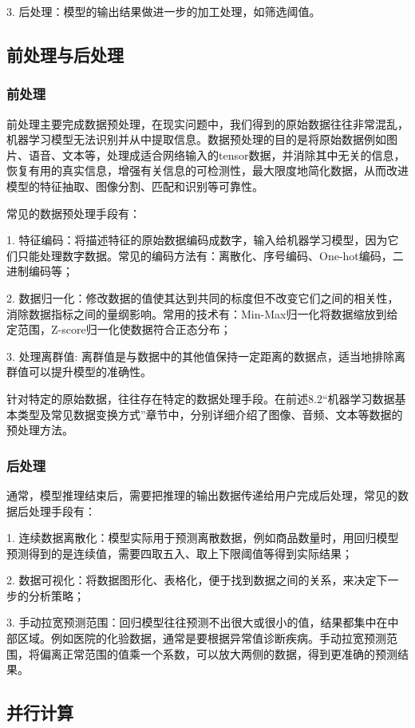 3. 后处理：模型的输出结果做进一步的加工处理，如筛选阈值。


\subsection{前处理与后处理}
\subsubsection{前处理}
前处理主要完成数据预处理，在现实问题中，我们得到的原始数据往往非常混乱，机器学习模型无法识别并从中提取信息。数据预处理的目的是将原始数据例如图片、语音、文本等，处理成适合网络输入的tensor数据，并消除其中无关的信息，恢复有用的真实信息，增强有关信息的可检测性，最大限度地简化数据，从而改进模型的特征抽取、图像分割、匹配和识别等可靠性。

常见的数据预处理手段有：

1. 特征编码：将描述特征的原始数据编码成数字，输入给机器学习模型，因为它们只能处理数字数据。常见的编码方法有：离散化、序号编码、One-hot编码，二进制编码等；

2. 数据归一化：修改数据的值使其达到共同的标度但不改变它们之间的相关性，消除数据指标之间的量纲影响。常用的技术有：Min-Max归一化将数据缩放到给定范围，Z-score归一化使数据符合正态分布；

3. 处理离群值: 离群值是与数据中的其他值保持一定距离的数据点，适当地排除离群值可以提升模型的准确性。

针对特定的原始数据，往往存在特定的数据处理手段。在前述8.2“机器学习数据基本类型及常见数据变换方式”章节中，分别详细介绍了图像、音频、文本等数据的预处理方法。
\subsubsection{后处理}
通常，模型推理结束后，需要把推理的输出数据传递给用户完成后处理，常见的数据后处理手段有：

1. 连续数据离散化：模型实际用于预测离散数据，例如商品数量时，用回归模型预测得到的是连续值，需要四取五入、取上下限阈值等得到实际结果；

2. 数据可视化：将数据图形化、表格化，便于找到数据之间的关系，来决定下一步的分析策略；

3. 手动拉宽预测范围：回归模型往往预测不出很大或很小的值，结果都集中在中部区域。例如医院的化验数据，通常是要根据异常值诊断疾病。手动拉宽预测范围，将偏离正常范围的值乘一个系数，可以放大两侧的数据，得到更准确的预测结果。

\subsection{并行计算}\label{sec:ch09/ch09-parallel-inference}

